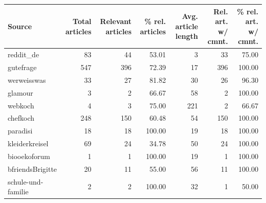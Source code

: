 \begin{table}
	\begin{tabular}{lrrrrrr}
		\toprule
		Source             & Total articles & Relevant articles & \% rel. articles & Avg. article length\footnotemark[1] & Rel. art. w/ cmnt. & \% rel. art. w/ cmnt. \\ \midrule
		reddit\_de         &             83 &                44 &            53.01 &                   3 &                 33 &                 75.00 \\
		gutefrage          &            547 &               396 &            72.39 &                  17 &                396 &                100.00 \\
		werweisswas        &             33 &                27 &            81.82 &                  30 &                 26 &                 96.30 \\
		glamour            &              3 &                 2 &            66.67 &                  58 &                  2 &                100.00 \\
		webkoch            &              4 &                 3 &            75.00 &                 221 &                  2 &                 66.67 \\
		chefkoch           &            248 &               150 &            60.48 &                  54 &                150 &                100.00 \\
		paradisi           &             18 &                18 &           100.00 &                  19 &                 18 &                100.00 \\
		kleiderkreisel     &             69 &                24 &            34.78 &                  50 &                 24 &                100.00 \\
		biooekoforum       &              1 &                 1 &           100.00 &                  19 &                  1 &                100.00 \\
		bfriendsBrigitte   &             20 &                11 &            55.00 &                  56 &                 11 &                100.00 \\
		schule-und-familie &              2 &                 2 &           100.00 &                  32 &                  1 &                 50.00 \\ \bottomrule
	\end{tabular}
	

\end{table}
